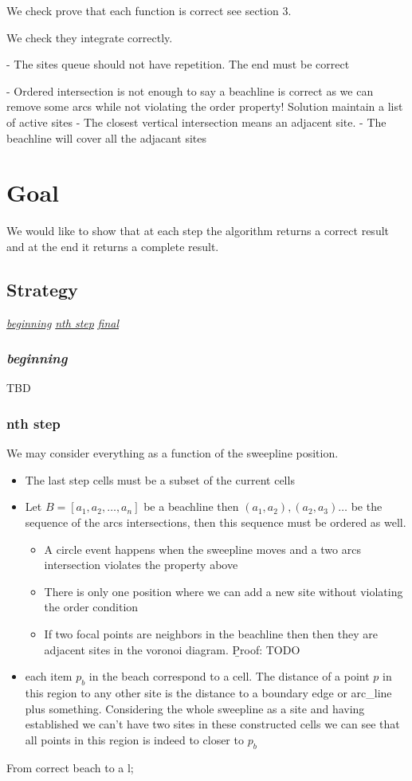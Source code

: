 \documentclass{article}
\begin{document}
We check prove that each function is correct see section 3. 

We check they integrate correctly. 

 - The sites queue should not have repetition. 
 The end must be correct

- Ordered intersection is not enough to say a beachline is correct as we can remove some arcs while not violating the order property! Solution maintain a list of active sites
- The closest vertical intersection means an adjacent site. 
- The beachline will cover all the adjacant sites
\section{Goal}
We would like to show that at each step the algorithm returns a correct result and at the end it returns a complete result.
\subsection{Strategy}
\underline{{\color{gray} \textit{beginning}}} \underline{ {\color{blue} \textit{nth step}}} \underline{{\color{black} \textit{ final}}}

\subsubsection{{\color{gray} \textit{beginning}}}
TBD
\subsubsection{{\color{blue} nth step}}
We may consider everything as a function of the sweepline position. 
\begin{itemize}
    \item The last step cells must be a subset of the current cells
    \item Let $B = \left[a_1, a_2, \dots, a_n \right]$ be a beachline then $\left(a_1, a_2\right), \left(a_2, a_3\right) \dots$ be the sequence of the arcs intersections, then this sequence must be ordered as well.
    \begin{itemize}
        \item A circle event happens when the sweepline moves and a two arcs intersection violates the property above
        \item There is only one position where we can add a new site without violating the order condition   
        \item If two focal points are neighbors in the beachline then then they are adjacent sites in the voronoi diagram.
        {\b Proof}: TODO 
        
        
    \end{itemize}
    \item each item $p_b$ in the beach correspond to a cell. The distance of a point $p$ in this region to any other site is the distance to a boundary edge or arc\_line plus something. Considering the whole sweepline as a site and having established we can't have two sites in these constructed cells we can see that all points in this region is indeed to closer to $p_b$
\end{itemize}
From correct beach to a l; 
\end{document}
